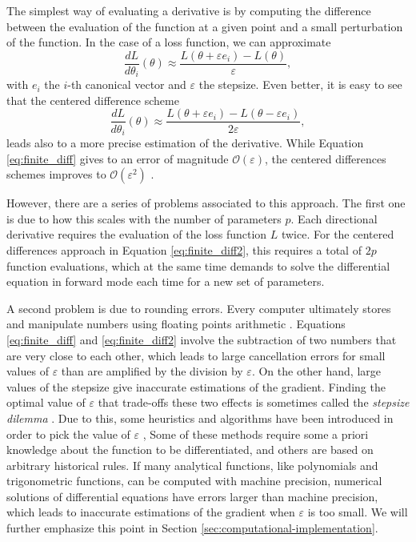 The simplest way of evaluating a derivative is by computing the difference between the evaluation of the function at a given point and a small perturbation of the function. 
In the case of a loss function, we can approximate
\begin{equation}
 \frac{dL}{d\theta_i} (\theta) \approx \frac{L(\theta + \varepsilon e_i ) - L(\theta)}{\varepsilon},
 \label{eq:finite_diff}
\end{equation}
with $e_i$ the $i$-th canonical vector and $\varepsilon$ the stepsize. 
Even better, it is easy to see that the centered difference scheme
\begin{equation}
 \frac{dL}{d\theta_i} (\theta) \approx \frac{L(\theta + \varepsilon e_i ) - L(\theta - \varepsilon e_i)}{2\varepsilon},
 \label{eq:finite_diff2}
\end{equation}
leads also to a more precise estimation of the derivative. 
While Equation \eqref{eq:finite_diff} gives to an error of magnitude $\mathcal O (\varepsilon)$, the centered differences schemes improves to $\mathcal O (\varepsilon^2)$ \cite{ascher2008-numerical-methods}. 
 
However, there are a series of problems associated to this approach.
The first one is due to how this scales with the number of parameters $p$.
Each directional derivative requires the evaluation of the loss function $L$ twice.
For the centered differences approach in Equation \eqref{eq:finite_diff2}, this requires a total of $2p$ function evaluations, which at the same time demands to solve the differential equation in forward mode each time for a new set of parameters.

A second problem is due to rounding errors.
Every computer ultimately stores and manipulate numbers using floating points arithmetic \cite{Goldberg_1991_floatingpoint}. 
Equations \eqref{eq:finite_diff} and \eqref{eq:finite_diff2} involve the subtraction of two numbers that are very close to each other, which leads to large cancellation errors for small values of $\varepsilon$ than are amplified by the division by $\varepsilon$.
On the other hand, large values of the stepsize give inaccurate estimations of the gradient. 
Finding the optimal value of $\varepsilon$ that trade-offs these two effects is sometimes called the \textit{stepsize dilemma} \cite{mathur2012stepsize-finitediff}.
Due to this, some heuristics and algorithms have been introduced in order to pick the value of $\varepsilon$ \cite{mathur2012stepsize-finitediff, BARTON_1992_finite_diff, SUNDIALS-hindmarsh2005sundials}, 
Some of these methods require some a priori knowledge about the function to be differentiated, and others are based on arbitrary historical rules. 
If many analytical functions, like polynomials and trigonometric functions, can be computed with machine precision, numerical solutions of differential equations have errors larger than machine precision, which leads to inaccurate estimations of the gradient when $\varepsilon$ is too small. 
We will further emphasize this point in Section \ref{sec:computational-implementation}.

